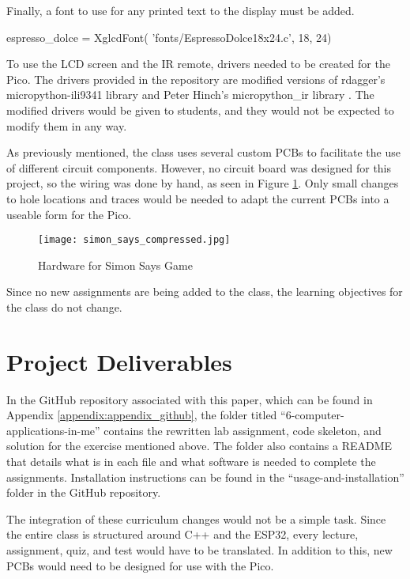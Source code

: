 \begin{tcolorbox}[breakable, enhanced jigsaw, title=ME 400: Assignment \ref{comp_app_assignment_1}, 
    colframe=ksu-purple, colback=ksu-gray]
Finally, a font to use for any printed text to the display must be added.

\begin{python}
espresso_dolce = XglcdFont(
    'fonts/EspressoDolce18x24.c', 18, 24)
\end{python}
\end{tcolorbox}

To use the LCD screen and the IR remote, drivers needed to be created for the Pico. 
The drivers provided in the repository are modified versions of
rdagger's micropython-ili9341 library \cite{micropython-ili9341} and Peter Hinch's 
micropython\_ir library \cite{micropython_ir2020}. The modified drivers would be given to 
students, and they would not be expected to modify them in any way.

As previously mentioned, the class uses several custom PCBs to facilitate the use
of different circuit components. However, no circuit board was designed for this 
project, so the wiring was done by hand, as seen in Figure \ref{fig:simon_says}. Only 
small changes to hole locations and traces would be needed to adapt the current PCBs 
into a useable form for the Pico.

\begin{figure}[h]
    \texttt{[image: simon\_says\_compressed.jpg]}
    \centering
    \caption{Hardware for Simon Says Game}
    \centering
    \label{fig:simon_says}
\end{figure}

Since no new assignments are being added to the class, the learning objectives for the 
class do not change.

\section{Project Deliverables}

In the GitHub repository associated with this paper, which can be found in Appendix
\ref{appendix:appendix_github}, the folder titled ``6-computer-applications-in-me'' 
contains the rewritten lab assignment, code skeleton, and solution for the exercise
mentioned above. The folder also contains a README that details what is in each file
and what software is needed to complete the assignments. Installation instructions can
be found in the ``usage-and-installation'' folder in the GitHub repository.

The integration of these curriculum changes would not be a simple task. Since the 
entire class is structured around C++ and the ESP32, every lecture, assignment, quiz,
and test would have to be translated. In addition to this, new PCBs would need to be 
designed for use with the Pico. 
